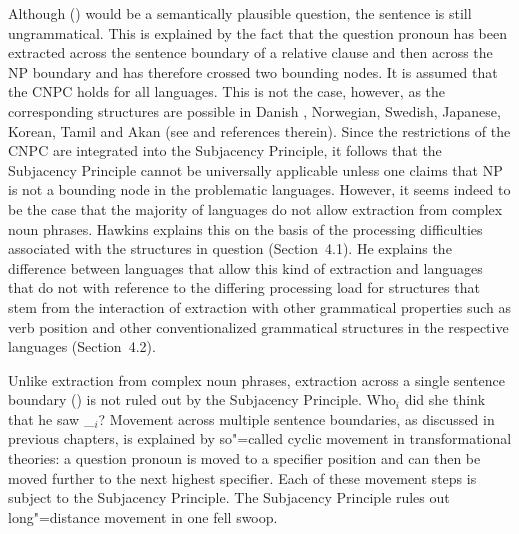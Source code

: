 \ea[*]{
Who$_i$ did he just read [\sub{NP} the report [\sub{S} that was about \_$_i$]?
}
\z
Although () would be a semantically plausible question, the sentence is still ungrammatical. This is explained by the fact that
the question pronoun has been extracted across the sentence boundary of a relative clause and then across the NP boundary and has therefore
crossed two bounding nodes. It is assumed that the CNPC holds for all languages. This is not the case, however, as the corresponding structures
are possible in Danish \citep[]{EL79a}, Norwegian,
Swedish, Japanese, Korean, Tamil
and Akan (see  and references therein).
Since the restrictions of the CNPC are integrated into the Subjacency Principle, it follows that the Subjacency Principle cannot be universally
applicable unless one claims that NP is not a bounding node in the problematic languages. However, it seems
indeed to be the case that the majority of languages do not allow extraction from complex noun phrases. Hawkins explains this on the basis of the processing difficulties
associated with the structures in question (Section~4.1). He explains the difference between languages that allow this kind of extraction and languages that do not
with reference to the differing processing load for structures that stem from the interaction of extraction with other grammatical properties such as verb position
and other conventionalized grammatical structures in the respective languages (Section~4.2).

Unlike extraction from complex noun phrases, extraction across a single sentence boundary () is not ruled out by the Subjacency Principle.
\ea
Who$_i$ did she think that he saw \_$_i$?
\z
Movement across multiple sentence boundaries, as discussed in previous chapters, is explained by so"=called cyclic movement
in transformational theories: a question pronoun is moved to a specifier position and can then be
moved further to the next highest specifier. Each of these
movement steps is subject to the Subjacency Principle. The Subjacency Principle rules out
long"=distance movement in one fell swoop.

